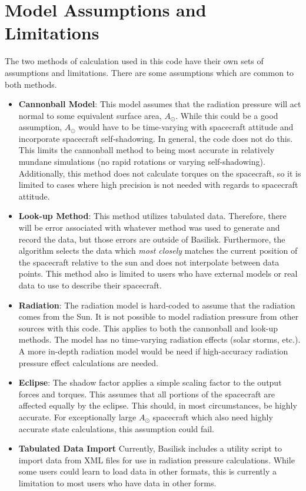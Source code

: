 \section{Model Assumptions and Limitations}
The two methods of calculation used in this code have their own sets of assumptions and limitations. There are some assumptions which are common to both methods.
\begin{itemize}
	\item \textbf{Cannonball Model}: This model assumes that the radiation pressure will act normal to some equivalent surface area, $A_{\odot}$. While this could be a good assumption, $A_{\odot}$ would have to be time-varying with spacecraft attitude and incorporate spacecraft self-shadowing. In general, the code does not do this. This limits the cannonball method to being most accurate in relatively mundane simulations (no rapid rotations or varying self-shadowing). Additionally, this method does not calculate torques on the spacecraft, so it is limited to cases where high precision is not needed with regards to spacecraft attitude.
	\item \textbf{Look-up Method}: This method utilizes tabulated data. Therefore, there will be error associated with whatever method was used to generate and record the data, but those errors are outside of Basilisk. Furthermore, the algorithm selects the data which \textit{most closely} matches the current position of the spacecraft relative to the sun and does not interpolate between data points.  This method also is limited to users who have external models or real data to use to describe their spacecraft.
	\item \textbf{Radiation}: The radiation model is hard-coded to assume that the radiation comes from the Sun. It is not possible to model radiation pressure from other sources with this code. This applies to both the cannonball and look-up methods. The model has no time-varying radiation effects (solar storms, etc.). A more in-depth radiation model would be need if high-accuracy radiation pressure effect calculations are needed.
	\item \textbf{Eclipse}: The shadow factor applies a simple scaling factor to the output forces and torques. This assumes that all portions of the spacecraft are affected equally by the eclipse. This should, in most circumstances, be highly accurate. For exceptionally large $A_{\odot}$ spacecraft which also need highly accurate state calculations, this assumption could fail.
	\item \textbf{Tabulated Data Import} Currently, Basilisk includes a utility script to import data from XML files for use in radiation pressure calculations. While some users could learn to load data in other formats, this is currently a limitation to most users who have data in other forms.
\end{itemize}